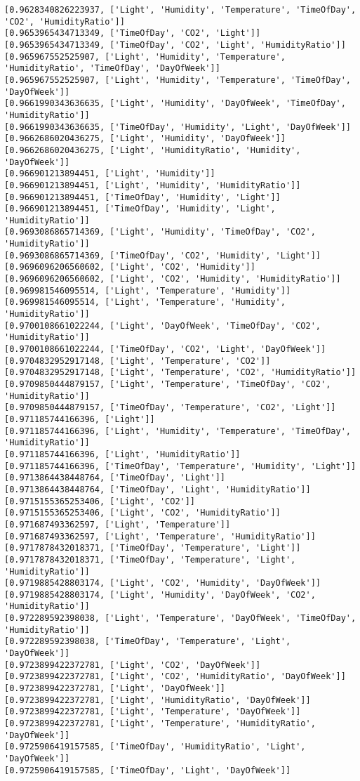 \documentclass[11pt]{article}
\begin{document}
\begin{Verbatim}[commandchars=\\\{\}]
[0.9628340826223937, ['Light', 'Humidity', 'Temperature', 'TimeOfDay', 'CO2', 'HumidityRatio']]
[0.9653965434713349, ['TimeOfDay', 'CO2', 'Light']]
[0.9653965434713349, ['TimeOfDay', 'CO2', 'Light', 'HumidityRatio']]
[0.965967552525907, ['Light', 'Humidity', 'Temperature', 'HumidityRatio', 'TimeOfDay', 'DayOfWeek']]
[0.965967552525907, ['Light', 'Humidity', 'Temperature', 'TimeOfDay', 'DayOfWeek']]
[0.9661990343636635, ['Light', 'Humidity', 'DayOfWeek', 'TimeOfDay', 'HumidityRatio']]
[0.9661990343636635, ['TimeOfDay', 'Humidity', 'Light', 'DayOfWeek']]
[0.9662686020436275, ['Light', 'Humidity', 'DayOfWeek']]
[0.9662686020436275, ['Light', 'HumidityRatio', 'Humidity', 'DayOfWeek']]
[0.966901213894451, ['Light', 'Humidity']]
[0.966901213894451, ['Light', 'Humidity', 'HumidityRatio']]
[0.966901213894451, ['TimeOfDay', 'Humidity', 'Light']]
[0.966901213894451, ['TimeOfDay', 'Humidity', 'Light', 'HumidityRatio']]
[0.9693086865714369, ['Light', 'Humidity', 'TimeOfDay', 'CO2', 'HumidityRatio']]
[0.9693086865714369, ['TimeOfDay', 'CO2', 'Humidity', 'Light']]
[0.9696096206560602, ['Light', 'CO2', 'Humidity']]
[0.9696096206560602, ['Light', 'CO2', 'Humidity', 'HumidityRatio']]
[0.969981546095514, ['Light', 'Temperature', 'Humidity']]
[0.969981546095514, ['Light', 'Temperature', 'Humidity', 'HumidityRatio']]
[0.9700108661022244, ['Light', 'DayOfWeek', 'TimeOfDay', 'CO2', 'HumidityRatio']]
[0.9700108661022244, ['TimeOfDay', 'CO2', 'Light', 'DayOfWeek']]
[0.9704832952917148, ['Light', 'Temperature', 'CO2']]
[0.9704832952917148, ['Light', 'Temperature', 'CO2', 'HumidityRatio']]
[0.9709850444879157, ['Light', 'Temperature', 'TimeOfDay', 'CO2', 'HumidityRatio']]
[0.9709850444879157, ['TimeOfDay', 'Temperature', 'CO2', 'Light']]
[0.971185744166396, ['Light']]
[0.971185744166396, ['Light', 'Humidity', 'Temperature', 'TimeOfDay', 'HumidityRatio']]
[0.971185744166396, ['Light', 'HumidityRatio']]
[0.971185744166396, ['TimeOfDay', 'Temperature', 'Humidity', 'Light']]
[0.9713864438448764, ['TimeOfDay', 'Light']]
[0.9713864438448764, ['TimeOfDay', 'Light', 'HumidityRatio']]
[0.9715155365253406, ['Light', 'CO2']]
[0.9715155365253406, ['Light', 'CO2', 'HumidityRatio']]
[0.971687493362597, ['Light', 'Temperature']]
[0.971687493362597, ['Light', 'Temperature', 'HumidityRatio']]
[0.9717878432018371, ['TimeOfDay', 'Temperature', 'Light']]
[0.9717878432018371, ['TimeOfDay', 'Temperature', 'Light', 'HumidityRatio']]
[0.9719885428803174, ['Light', 'CO2', 'Humidity', 'DayOfWeek']]
[0.9719885428803174, ['Light', 'Humidity', 'DayOfWeek', 'CO2', 'HumidityRatio']]
[0.972289592398038, ['Light', 'Temperature', 'DayOfWeek', 'TimeOfDay', 'HumidityRatio']]
[0.972289592398038, ['TimeOfDay', 'Temperature', 'Light', 'DayOfWeek']]
[0.9723899422372781, ['Light', 'CO2', 'DayOfWeek']]
[0.9723899422372781, ['Light', 'CO2', 'HumidityRatio', 'DayOfWeek']]
[0.9723899422372781, ['Light', 'DayOfWeek']]
[0.9723899422372781, ['Light', 'HumidityRatio', 'DayOfWeek']]
[0.9723899422372781, ['Light', 'Temperature', 'DayOfWeek']]
[0.9723899422372781, ['Light', 'Temperature', 'HumidityRatio', 'DayOfWeek']]
[0.9725906419157585, ['TimeOfDay', 'HumidityRatio', 'Light', 'DayOfWeek']]
[0.9725906419157585, ['TimeOfDay', 'Light', 'DayOfWeek']]


\end{Verbatim}
\end{document}
